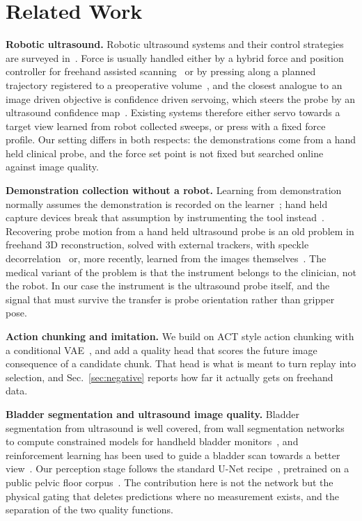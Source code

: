 \documentclass[conference]{IEEEtran}
\begin{document}
\section{Related Work}

\textbf{Robotic ultrasound.} Robotic ultrasound systems and their control
strategies are surveyed
in~\cite{priester2013robotic,vonhaxthausen2021medical,li2021overview,jiang2023robotic}.
Force is usually handled either by a hybrid force and position controller for
freehand assisted scanning~\cite{gilbertson2015force} or by pressing along a
planned trajectory registered to a preoperative volume~\cite{hennersperger2017towards},
and the closest analogue to an image driven objective is confidence driven
servoing, which steers the probe by an ultrasound confidence
map~\cite{chatelain2017confidence}. Existing systems therefore either servo
towards a target view learned from robot collected sweeps, or press with a fixed
force profile. Our setting differs
in both respects: the demonstrations come from a hand held clinical probe, and
the force set point is not fixed but searched online against image quality.

\textbf{Demonstration collection without a robot.} Learning from demonstration
normally assumes the demonstration is recorded on the
learner~\cite{argall2009survey,ravichandar2020recent}; hand held capture devices
break that assumption by instrumenting the tool
instead~\cite{chi2024umi}. Recovering probe motion from a hand held ultrasound
probe is an old problem in freehand 3D reconstruction, solved with external
trackers, with speckle decorrelation~\cite{prager1999stradx,housden2007sensorless}
or, more recently, learned from the images
themselves~\cite{prevost2018freehand}. The medical variant of the problem is
that the instrument belongs to the clinician, not the robot. In our case the instrument is the ultrasound probe itself, and the signal
that must survive the transfer is probe orientation rather than gripper pose.

\textbf{Action chunking and imitation.} We build on ACT style action chunking
with a conditional VAE~\cite{zhao2023act}, and add a quality head that scores the
future image consequence of a candidate chunk. That head is what is meant to
turn replay into selection, and Sec.~\ref{sec:negative} reports how far it
actually gets on freehand data.

\textbf{Bladder segmentation and ultrasound image quality.} Bladder
segmentation from ultrasound is well covered, from wall segmentation
networks~\cite{saini2026bwsnet} to compute constrained models for handheld
bladder monitors~\cite{song2023memory}, and reinforcement learning has been
used to guide a bladder scan towards a better view~\cite{hsu2026active}. Our
perception stage follows the standard U-Net recipe~\cite{ronneberger2015unet},
pretrained on a public pelvic floor
corpus~\cite{solismartin2026pfus1,garciamejido2024applicability}. The contribution here is not the network but the
physical gating that deletes predictions where no measurement exists, and the
separation of the two quality functions.
\end{document}
